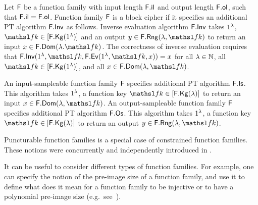 Let $\FF$ be a function family with input length $\mathsf{F}.\mathsf{il}$ and output length $\mathsf{F}.\mathsf{ol}$, such that $\mathsf{F}.\mathsf{il}=\mathsf{F}.\mathsf{ol}$.
Function family $\FF$ is a block cipher if it specifies an additional PT algorithm $\mathsf{F}.\mathsf{Inv}$ as follows.
Inverse evaluation algorithm $\mathsf{F}.\mathsf{Inv}$ takes $\secIn$, $\FKey\in[\Kg{\FF}(\secIn)]$ and an output $y\in\Rng{\FF}(\secParam, \FKey)$ to return an input $x\in\Dom{\FF}(\secParam. \FKey)$.
The correctness of inverse evaluation requires that $\Inv{\FF}(\secIn, \FKey, \Ev{\FF}(\secIn, \FKey, x)) = x$ for all $\secParam\in\N$, all $\FKey\in[\Kg{\FF}(\secIn)]$, and all $x\in\Dom{\FF}(\secParam, \FKey)$.

An input-sampleable function family $\FF$ specifies additional PT algorithm $\Is{\FF}$.
This algorithm takes $\secIn$, a function key $\FKey\in[\Kg{\FF}(\secParam)]$ to return an input $x\in\Dom{\FF}(\secParam,\FKey)$.
An output-sampleable function family $\FF$ specifies additional PT algorithm $\mathsf{F}.\mathsf{Os}$.
This algorithm takes $\secIn$, a function key $\FKey\in[\Kg{\FF}(\secParam)]$ to return an output $y\in\Rng{\FF}(\secParam,\FKey)$.

Puncturable function families is a special case of constrained function families.
These notions were concurrently and independently introduced in \cite{AC:BonWat13,CCS:KPTZ13,PKC:BoyGolIva14}.

It can be useful to consider different types of function families.
For example, one can specify the notion of the pre-image size of a function family, and use it to define what does it mean for a function family to be injective or to have a polynomial pre-image size (e.g.~see~\cite{AC:BelSteTes14}).


\iffalse
\heading{Function families.}
We say that $\FF$ is injective if the function $\FEv(\secIn,\FKey,\cdot)\Colon\FInpSet(\secParam)\to\FOutSet(\secParam)$ is injective for all $\secParam\in\N$ and $\FKey\in [\FKg(\secIn)]$.
	
I now give a slightly different proposed definition.\footnote{In the below I adopt that algorithms will always be considered to be PT unless specified otherwise.
Perhaps also the convention that any operation/algorithm applied to $\bot$ returns $\bot$ (in particular that the boolean $\bot=x$ equals $\bot$ for all $x$.)}

\begin{defn}
	An input-sampleable family of functions $\FF$ is a family of functions which additionally specifies a randomized algorithm $\Is{\FF}$.
	This algorithm outputs an $x\in\Dom{\FF}(\secParam,\key)$ when given security parameter $\secIn$ and key $\key\in\Keys{\FF}(\secParam)$ as inputs.  
\end{defn}

In this case we assume $\Kg{\FF}$ is the algorithm which samples $\key\in\bits^{\kl{\FF}(\secParam)}$ uniformly at random and $\Is{\FF}$ is the algorithm which samples $x\in\bits^{\il{\FF}(\secParam)}$ uniformly at random. 

\fi
